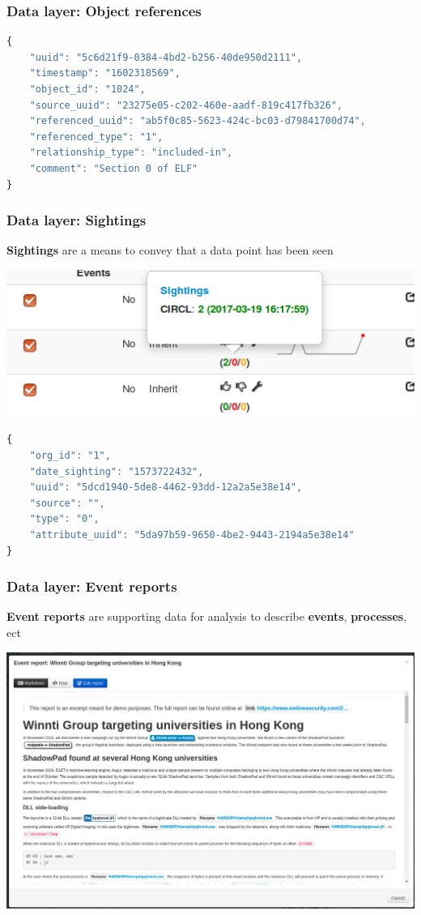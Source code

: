 \begin{frame}[fragile]
    \frametitle{Data layer: Object references}
    \begin{lstlisting}[language=javascript,firstnumber=1]
{
    "uuid": "5c6d21f9-0384-4bd2-b256-40de950d2111",
    "timestamp": "1602318569",
    "object_id": "1024",
    "source_uuid": "23275e05-c202-460e-aadf-819c417fb326",
    "referenced_uuid": "ab5f0c85-5623-424c-bc03-d79841700d74",
    "referenced_type": "1",
    "relationship_type": "included-in",
    "comment": "Section 0 of ELF"
}
\end{lstlisting}
\end{frame}

\begin{frame}[fragile]
    \frametitle{Data layer: Sightings}
    {\bf Sightings} are a means to convey that a data point has been seen
    \begin{center}
        \includegraphics[width=1.0\linewidth]{screenshots/sighting-n.png}
    \end{center}
    \begin{lstlisting}[language=javascript,firstnumber=1]
{
    "org_id": "1",
    "date_sighting": "1573722432",
    "uuid": "5dcd1940-5de8-4462-93dd-12a2a5e38e14",
    "source": "",
    "type": "0",
    "attribute_uuid": "5da97b59-9650-4be2-9443-2194a5e38e14"
}
\end{lstlisting}
\end{frame}

\begin{frame}[fragile]
    \frametitle{Data layer: Event reports}
    {\bf Event reports} are supporting data for analysis to describe {\bf events}, {\bf processes}, ect
    \begin{center}
        \includegraphics[width=0.9\linewidth]{screenshots/event-report.png}
    \end{center}
\end{frame}

